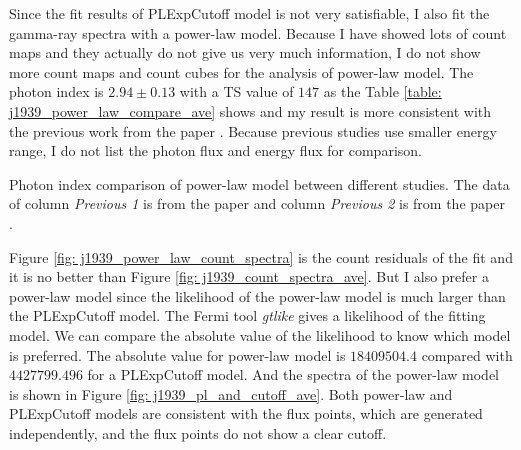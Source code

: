 \documentclass[12pt]{report}
\newcommand{\mycaption}[1]{\protect \caption{#1}}
\begin{document}
            Since the fit results of PLExpCutoff model is not very satisfiable, I also fit the 
            gamma-ray spectra with a power-law model. Because I have showed lots of count maps 
            and they actually do not give us very much information, I do not show more count maps 
            and count cubes for the analysis of power-law model. The photon index is 
            $2.94\pm0.13$ with a TS value of $147$ as the Table 
            \ref{table: j1939_power_law_compare_ave} shows and my result is more consistent with 
            the previous work from the paper \cite{J1939_old}. Because previous studies use
            smaller energy range, I do not list the photon flux and energy flux for comparison. 
            \begin{table}[!ht]
              \centering
                \mycaption{Photon index comparison of power-law model between different 
                  studies. The data of column \textit{Previous 1} is from the paper 
                  \cite{0004-637X-787-2-167} and column \textit{Previous 2} is from the paper 
                  \cite{J1939_old}.}
                \label{table: j1939_power_law_compare_ave}        
            \end{table}  

            Figure \ref{fig: j1939_power_law_count_spectra} is the count residuals of the fit and 
            it is no better than Figure \ref{fig: j1939_count_spectra_ave}. But I also prefer a 
            power-law model since the likelihood of the power-law model is much larger than the 
            PLExpCutoff model. The Fermi tool \textit{gtlike} gives a likelihood of the fitting 
            model. We can compare the absolute value of the likelihood to know which model is 
            preferred. The absolute value for power-law model is $18409504.4$ compared with 
            $4427799.496$ for a PLExpCutoff model. And the spectra of the power-law model is 
            shown in Figure \ref{fig: j1939_pl_and_cutoff_ave}. Both power-law and PLExpCutoff 
            models are consistent with the flux points, which are generated independently, and 
            the flux points do not show a clear cutoff. 
\end{document}
